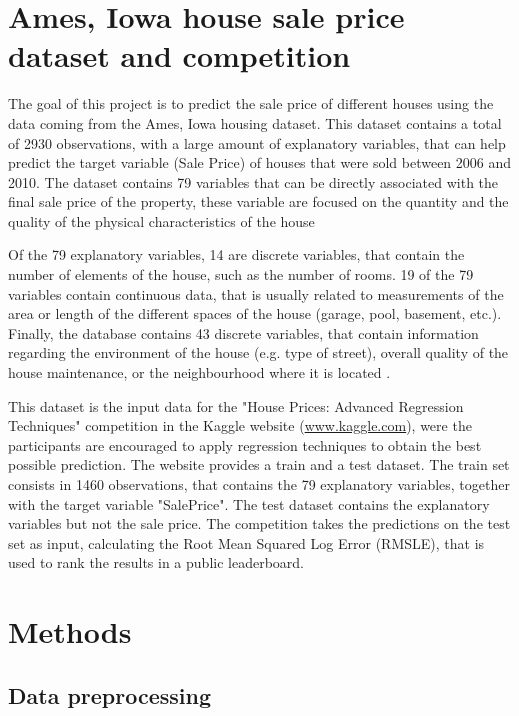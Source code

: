 \documentclass[11pt,onecolumn,titlepage,letterpaper]{article}
\begin{document}


\section{Ames, Iowa house sale price dataset and competition}

The goal of this project is to predict the sale price of different houses using the data coming from the Ames, Iowa housing dataset. This dataset contains a total of 2930 observations, with a large amount of explanatory variables, that can help predict the target variable (Sale Price) of houses that were sold between 2006 and 2010. The dataset contains 79 variables that can be directly associated with the final sale price of the property, these variable are focused on the quantity and the quality of the physical characteristics of the house \cite{DeCock2011}

Of the 79 explanatory variables, 14 are discrete variables, that contain the number of elements of the house, such as the number of rooms. 19 of the 79 variables contain continuous data, that is usually related to measurements of the area or length of the different spaces of the house (garage, pool, basement, etc.). Finally, the database contains 43 discrete variables, that contain information regarding the environment of the house (e.g. type of street), overall quality of the house maintenance, or the neighbourhood where it is located \cite{DeCock2011}.

This dataset is the input data for the "House Prices: Advanced Regression Techniques" competition in the Kaggle website (\url{www.kaggle.com}), were the participants are encouraged to apply regression techniques to obtain the best possible prediction. The website provides a train and a test  dataset. The train set consists in 1460 observations, that contains the 79 explanatory variables, together with the target variable "SalePrice". The test dataset contains the explanatory variables but not the sale price. The competition takes the predictions on the test set as input, calculating the Root Mean Squared Log Error (RMSLE), that is used to rank the results in a public leaderboard.

\section{Methods}

\subsection{Data preprocessing}
\end{document}
